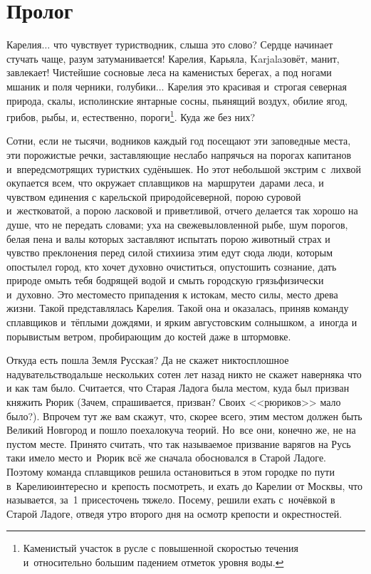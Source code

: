 {

{
\cleardoublepage
{}


\section*{Пролог}

\fancyhead[LE]{\fancyplain{}{}}
\fancyhead[RO]{\fancyplain{}{}}

Карелия$\ldots$ что чувствует турист\sdash водник, слыша это слово? Сердце начинает стучать чаще, разум затуманивается! Карелия, Карьяла, Karjala\mdash зовёт, манит, завлекает! Чистейшие сосновые леса на каменистых берегах, а под ногами мшаник и поля черники, голубики$\ldots$ Карелия это красивая и~строгая северная природа, скалы, исполинские янтарные сосны, пьянящий воздух, обилие ягод, грибов, рыбы, и, естественно, пороги\footnote{Каменистый участок в русле с повышенной скоростью течения и~относительно большим падением отметок уровня воды.}. Куда же без них? 

Сотни, если не тысячи, водников каждый год посещают эти заповедные места, эти порожистые речки, заставляющие неслабо напрячься на порогах капитанов и~впередсмотрящих туристких судёнышек. Но этот небольшой экстрим с~лихвой окупается всем, что окружает сплавщиков на~маршруте\mdash и~дарами леса, и чувством единения с карельской природой\mdash северной, порою суровой и~жестковатой, а порою ласковой и приветливой, отчего делается так хорошо на душе, что не передать словами; уха на свежевыловленной рыбе, шум порогов, белая пена и валы которых заставляют испытать порою животный страх и чувство преклонения перед силой стихии\mdash за этим едут сюда люди, которым опостылел город, кто хочет духовно очиститься, опустошить сознание, дать природе омыть тебя бодрящей водой и смыть городскую грязь\mdash физически и~духовно. Это место\mdash место припадения к истокам, место силы, место древа жизни. Такой представлялась Карелия. Такой она и оказалась, приняв команду сплавщиков и~тёплыми дождями, и ярким августовским солнышком, а~иногда и порывистым ветром, пробирающим до костей даже в штормовке.  

Откуда есть пошла Земля Русская? Да не скажет никто\mdash сплошное надувательство\mdash дальше нескольких сотен лет назад никто не скажет наверняка что и как там было. Считается, что Старая Ладога была местом, куда был призван княжить Рюрик (Зачем, спрашивается, призван? Своих <<рюриков>> мало было?). Впрочем тут же вам скажут, что, скорее всего, этим местом должен быть Великий Новгород и пошло поехало\mdash куча теорий. Но~все они, конечно же, не на пустом месте. Принято считать, что так называемое призвание варягов на Русь таки имело место и~Рюрик всё же сначала обосновался в Старой Ладоге. Поэтому команда сплавщиков решила остановиться в этом городке по пути в~Карелию\mdash интересно и~крепость посмотреть, и ехать до Карелии от Москвы, что называется, за~1 присест\mdash очень тяжело. Посему, решили ехать с~ночёвкой в Старой Ладоге, отведя утро второго дня на осмотр крепости и окрестностей. 

}}
